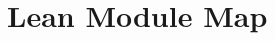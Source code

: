 \documentclass[11pt]{article}
\begin{document}

%

\appendix

\section{Lean Module Map}
\label{app:modules}

\end{document}
